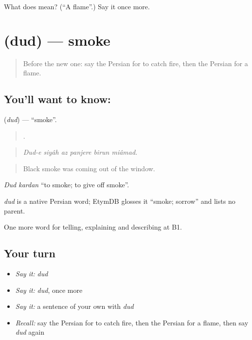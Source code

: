 \begin{tcolorbox}[breakable,colback=teal!4,colframe=teal!35!black,title={Before you move on}]
What does  mean? (\textquotedblleft{}A flame\textquotedblright{}.) Say it once more.
\end{tcolorbox}
\section[\texorpdfstring{\fa{دود} (dud)}{دود (dud)}]{ (dud) — smoke}

\label{lesson:FA-C328-dud}



\begin{quote}
Before the new one: say the Persian for to catch fire, then the Persian for a flame.
\end{quote}

\subsection*{You'll want to know: }
\textbf{} (\emph{dud}) — \textquotedblleft{}smoke\textquotedblright{}.

\begin{quote}
     .
\end{quote}

\begin{quote}
\emph{Dud-e siyâh az panjere birun miâmad.}
\end{quote}

\begin{quote}
Black smoke was coming out of the window.
\end{quote}

\emph{Dud kardan} \textquotedblleft{}to smoke; to give off smoke\textquotedblright{}.

\begin{cousinweb}
\emph{dud} is a native Persian word; EtymDB glosses it \textquotedblleft{}smoke; sorrow\textquotedblright{} and lists no parent.
\end{cousinweb}

\begin{grammarlens}[title={What you've built}]
One more word for telling, explaining and describing at B1.
\end{grammarlens}

\subsection*{Your turn}
\begin{itemize}
\raggedright
  \item \emph{Say it:} \emph{dud}
  \item \emph{Say it:} \emph{dud}, once more
  \item \emph{Say it:} a sentence of your own with \emph{dud}
  \item \emph{Recall:} say the Persian for to catch fire, then the Persian for a flame, then say \emph{dud} again
\end{itemize}


